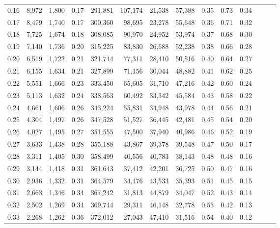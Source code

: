 \begin{tabular}{rrrrrrrrrrrrrr}
0.16 &   8,972 &  1,800 &  0.17 &  291,881 &  107,174 &  21,538 &  57,388 &  0.35 &  0.73 &      0.34 \\
0.17 &   8,479 &  1,740 &  0.17 &  300,360 &   98,695 &  23,278 &  55,648 &  0.36 &  0.71 &      0.32 \\
0.18 &   7,725 &  1,674 &  0.18 &  308,085 &   90,970 &  24,952 &  53,974 &  0.37 &  0.68 &      0.30 \\
0.19 &   7,140 &  1,736 &  0.20 &  315,225 &   83,830 &  26,688 &  52,238 &  0.38 &  0.66 &      0.28 \\
0.20 &   6,519 &  1,722 &  0.21 &  321,744 &   77,311 &  28,410 &  50,516 &  0.40 &  0.64 &      0.27 \\
0.21 &   6,155 &  1,634 &  0.21 &  327,899 &   71,156 &  30,044 &  48,882 &  0.41 &  0.62 &      0.25 \\
0.22 &   5,551 &  1,666 &  0.23 &  333,450 &   65,605 &  31,710 &  47,216 &  0.42 &  0.60 &      0.24 \\
0.23 &   5,113 &  1,632 &  0.24 &  338,563 &   60,492 &  33,342 &  45,584 &  0.43 &  0.58 &      0.22 \\
0.24 &   4,661 &  1,606 &  0.26 &  343,224 &   55,831 &  34,948 &  43,978 &  0.44 &  0.56 &      0.21 \\
0.25 &   4,304 &  1,497 &  0.26 &  347,528 &   51,527 &  36,445 &  42,481 &  0.45 &  0.54 &      0.20 \\
0.26 &   4,027 &  1,495 &  0.27 &  351,555 &   47,500 &  37,940 &  40,986 &  0.46 &  0.52 &      0.19 \\
0.27 &   3,633 &  1,438 &  0.28 &  355,188 &   43,867 &  39,378 &  39,548 &  0.47 &  0.50 &      0.17 \\
0.28 &   3,311 &  1,405 &  0.30 &  358,499 &   40,556 &  40,783 &  38,143 &  0.48 &  0.48 &      0.16 \\
0.29 &   3,144 &  1,418 &  0.31 &  361,643 &   37,412 &  42,201 &  36,725 &  0.50 &  0.47 &      0.16 \\
0.30 &   2,936 &  1,332 &  0.31 &  364,579 &   34,476 &  43,533 &  35,393 &  0.51 &  0.45 &      0.15 \\
0.31 &   2,663 &  1,346 &  0.34 &  367,242 &   31,813 &  44,879 &  34,047 &  0.52 &  0.43 &      0.14 \\
0.32 &   2,502 &  1,269 &  0.34 &  369,744 &   29,311 &  46,148 &  32,778 &  0.53 &  0.42 &      0.13 \\
0.33 &   2,268 &  1,262 &  0.36 &  372,012 &   27,043 &  47,410 &  31,516 &  0.54 &  0.40 &      0.12 \\

\end{tabular}
